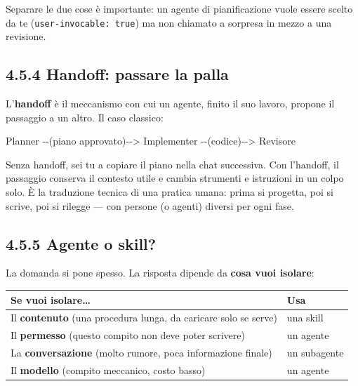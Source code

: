 \documentclass[
  italian,
  10pt,
]{book}
\newenvironment{Shaded}{\begin{snugshade}}{\end{snugshade}}
\newcommand{\NormalTok}[1]{#1}
\newcounter{none} %
\begin{document}
Separare le due cose è importante: un agente di pianificazione vuole
essere scelto da te (\texttt{user-invocable:\ true}) ma non chiamato a
sorpresa in mezzo a una revisione.

\subsection{4.5.4 Handoff: passare la
palla}\label{handoff-passare-la-palla}

L'\textbf{handoff} è il meccanismo con cui un agente, finito il suo
lavoro, propone il passaggio a un altro. Il caso classico:

\begin{Shaded}
\begin{Highlighting}[]
\NormalTok{Planner {-}{-}(piano approvato){-}{-}\textgreater{} Implementer {-}{-}(codice){-}{-}\textgreater{} Revisore}
\end{Highlighting}
\end{Shaded}

Senza handoff, sei tu a copiare il piano nella chat successiva. Con
l'handoff, il passaggio conserva il contesto utile e cambia strumenti e
istruzioni in un colpo solo. È la traduzione tecnica di una pratica
umana: prima si progetta, poi si scrive, poi si rilegge --- con persone
(o agenti) diversi per ogni fase.

\subsection{4.5.5 Agente o skill?}\label{agente-o-skill}

La domanda si pone spesso. La risposta dipende da \textbf{cosa vuoi
isolare}:

{\def\LTcaptype{none} %
\begin{longtable}[]{@{}
  >{\raggedright\arraybackslash}p{}
  >{\raggedright\arraybackslash}p{}@{}}
\toprule\noalign{}
\begin{minipage}[b]{\linewidth}\raggedright
Se vuoi isolare\ldots{}
\end{minipage} & \begin{minipage}[b]{\linewidth}\raggedright
Usa
\end{minipage} \\
\midrule\noalign{}
\endhead
\bottomrule\noalign{}
\endlastfoot
Il \textbf{contenuto} (una procedura lunga, da caricare solo se serve) &
una skill \\
Il \textbf{permesso} (questo compito non deve poter scrivere) & un
agente \\
La \textbf{conversazione} (molto rumore, poca informazione finale) & un
subagente \\
Il \textbf{modello} (compito meccanico, costo basso) & un agente \\
\end{longtable}
}
\end{document}
